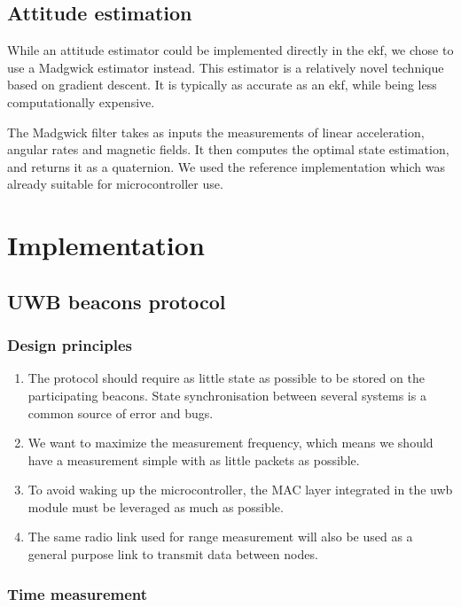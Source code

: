 \documentclass[a4paper, 12pt]{scrreprt}
\begin{document}
\section{Attitude estimation}

While an attitude estimator could be implemented directly in the \gls{ekf}, we chose to use a Madgwick estimator instead.
This estimator is a relatively novel technique based on gradient descent.
It is typically as accurate as an \gls{ekf}, while being less computationally expensive\cite{madgwick2011estimation}.

The Madgwick filter takes as inputs the measurements of linear acceleration, angular rates and magnetic fields.
It then computes the optimal state estimation, and returns it as a quaternion.
We used the reference implementation\cite{madgwick2011estimation} which was already suitable for microcontroller use.

\chapter{Implementation}

\section{UWB beacons protocol}

\subsection{Design principles}

\begin{enumerate}
    \item The protocol should require as little state as possible to be stored on the participating beacons.
        State synchronisation between several systems is a common source of error and bugs.
    \item We want to maximize the measurement frequency, which means we should have a measurement simple with as little packets as possible.
    \item To avoid waking up the microcontroller, the MAC layer integrated in the \gls{uwb} module must be leveraged as much as possible.
    \item The same radio link used for range measurement will also be used as a general purpose link to transmit data between nodes.
\end{enumerate}

\subsection{Time measurement}
\end{document}
